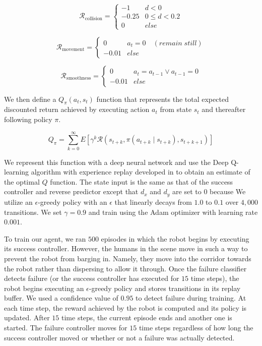 \documentclass[letterpaper, 10 pt, conference]{ieeeconf}  %
\begin{document}
		\begin{equation}\label{eq:rcollision}
			\mathcal{R}_{\text{collision}} = \begin{cases}
				-1      &   d < 0\\
				-0.25   &   0 \leq d < 0.2\\
				0       &   else
			\end{cases}
		\end{equation}
		
		\begin{equation}\label{eq:rmovement}
			\mathcal{R}_{\text{movement}} = \begin{cases}
			0       &   a_t = 0 \quad(remain\;still)\\
			-0.01   &   else
			\end{cases}
		\end{equation}
		
		\begin{equation}\label{eq:rsmoothness}
			\mathcal{R}_{\text{smoothness}} = \begin{cases}
			0       &   a_t = a_{t-1} \vee a_{t-1} = 0\\
			-0.01   &   else
			\end{cases}
		\end{equation}
		
		We then define a $Q_{\pi}(a_t, s_t)$ function that represents the total expected discounted return achieved by executing action $a_t$ from state $s_t$ and thereafter following policy $\pi$. 
		
		\begin{equation}\label{eq:q}
			Q_{\pi} = 
			\sum_{k=0}^{\infty}E[\gamma^k \mathcal{R}(s_{t+k}, \pi(a_{t+k} \mid s_{t+k}), s_{t+k+1})]
		\end{equation}
		
		We represent this function with a deep neural network and use the Deep Q-learning algorithm with experience replay developed in \cite{dqn} to obtain an estimate of the optimal $Q$ function. The state input is the same as that of the success controller and reverse predictor except that $d_x$ and $d_y$ are set to $0$ because We utilize an $\epsilon$-greedy policy with an $\epsilon$ that linearly decays from $1.0$ to $0.1$ over $4,000$ transitions. We set $\gamma=0.9$ and train using the Adam optimizer with learning rate $0.001$. 
		
		To train our agent, we ran $500$ episodes in which the robot begins by executing its success controller. However, the humans in the scene move in such a way to prevent the robot from barging in. Namely, they move into the corridor towards the robot rather than dispersing to allow it through. Once the failure classifier detects failure (or the success controller has executed for $15$ time steps), the robot begins executing an $\epsilon$-greedy policy and stores transitions in its replay buffer. We used a confidence value of $0.95$ to detect failure during training. At each time step, the reward achieved by the robot is computed and its policy is updated. After $15$ time steps, the current episode ends and another one is started. The failure controller moves for $15$ time steps regardless of how long the success controller moved or whether or not a failure was actually detected. 
		
\end{document}
